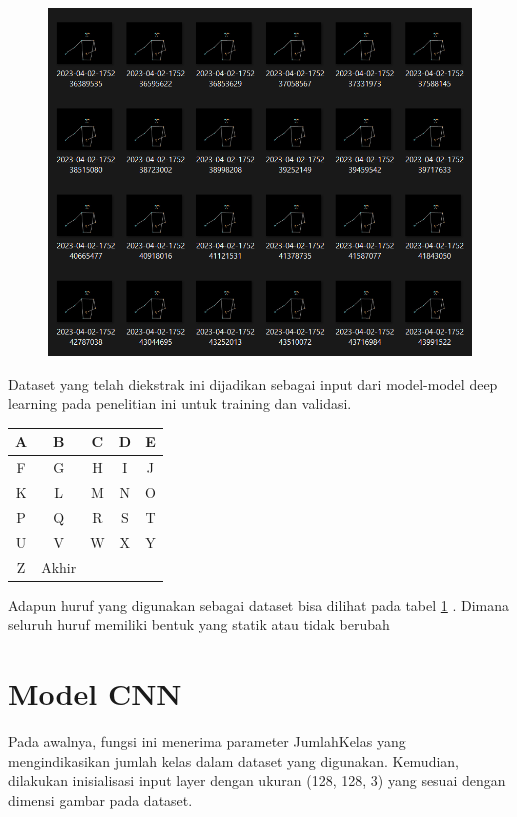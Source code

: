 \begin{figure}[!hbt]
	\centering
	\includegraphics[width=0.7\linewidth]{gambar/tugas-akhir-dawe.png}
	\label{fig:Datasetekstark}
\end{figure}
Dataset yang telah diekstrak ini dijadikan sebagai input dari model-model deep learning pada penelitian ini untuk training dan validasi. 

\begin{table}[htbp]
	\centering
	\label{tab:datasethuruf}
	\begin{tabular}{|c|c|c|c|c|}
		\hline
		A & B & C & D & E \\
		\hline
		F & G & H & I & J \\
		\hline
		K & L & M & N & O \\
		\hline
		P & Q & R & S & T \\
		\hline
		U & V & W & X & Y \\
		\hline
		Z &   Akhir &   &   &   \\
		\hline
	\end{tabular}
\end{table}

Adapun huruf yang digunakan sebagai dataset bisa dilihat pada tabel \ref{tab:datasethuruf} . Dimana seluruh huruf memiliki bentuk yang statik atau tidak berubah

\section{Model CNN}

Pada awalnya, fungsi ini menerima parameter JumlahKelas yang mengindikasikan jumlah kelas dalam dataset yang digunakan. Kemudian, dilakukan inisialisasi input layer dengan ukuran (128, 128, 3) yang sesuai dengan dimensi gambar pada dataset.


